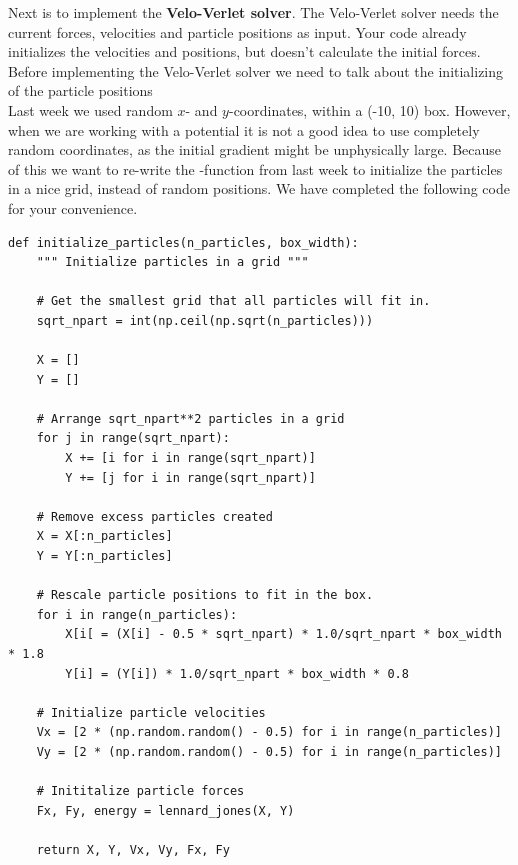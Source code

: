 \documentclass{article}
\begin{document}
\vspace{10pt}

Next is to implement the {\bf Velo-Verlet solver}.
The Velo-Verlet solver needs the current forces, velocities and particle positions as input.
Your code already initializes the velocities and positions, but doesn't calculate the initial forces. Before implementing the Velo-Verlet solver we need to talk about the initializing of the particle positions \\

Last week we used random $x$- and $y$-coordinates, within a (-10, 10) box.
However, when we are working with a potential it is not a good idea to use completely random coordinates, as the initial gradient might be unphysically large.
Because of this we want to re-write the -function from last week to initialize the particles in a nice grid, instead of random positions.
We have completed the following code for your convenience.

\begin{lstlisting}
def initialize_particles(n_particles, box_width):
    """ Initialize particles in a grid """
    
    # Get the smallest grid that all particles will fit in.
    sqrt_npart = int(np.ceil(np.sqrt(n_particles)))

    X = []
    Y = []

    # Arrange sqrt_npart**2 particles in a grid
    for j in range(sqrt_npart):
        X += [i for i in range(sqrt_npart)]
        Y += [j for i in range(sqrt_npart)]

    # Remove excess particles created
    X = X[:n_particles]
    Y = Y[:n_particles]

    # Rescale particle positions to fit in the box.
    for i in range(n_particles):
        X[i[ = (X[i] - 0.5 * sqrt_npart) * 1.0/sqrt_npart * box_width * 1.8
        Y[i] = (Y[i]) * 1.0/sqrt_npart * box_width * 0.8

    # Initialize particle velocities
    Vx = [2 * (np.random.random() - 0.5) for i in range(n_particles)]
    Vy = [2 * (np.random.random() - 0.5) for i in range(n_particles)]

    # Inititalize particle forces
    Fx, Fy, energy = lennard_jones(X, Y)

    return X, Y, Vx, Vy, Fx, Fy

\end{lstlisting}
\end{document}
